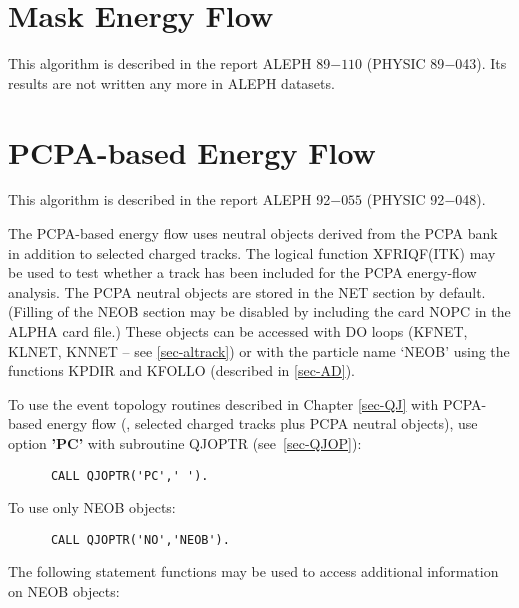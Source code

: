 \par
\section{\label{sec-EFLWM}Mask Energy Flow}
\par
This algorithm is described in the report ALEPH 89$-110$ (PHYSIC 89$-$043).
Its results are not written any more in ALEPH datasets.

\par
\section{\label{sec-EFLWP}PCPA-based Energy Flow}
\par
This algorithm is described in the report ALEPH 92$-055$ (PHYSIC 92$-$048).
\par
The PCPA-based energy flow uses neutral objects derived from the
PCPA bank in addition to selected charged tracks. The logical
function XFRIQF(ITK) may be used to test whether a track has been
included for the PCPA energy-flow analysis.
The PCPA neutral objects are stored in the NET section by default.
(Filling of the NEOB section may be disabled by including the card
NOPC in
the ALPHA card file.)
These objects can be accessed with DO loops
(KFNET, KLNET, KNNET -- see \ref{sec-altrack})
or with the particle name `NEOB' using
the functions KPDIR and KFOLLO (described in
\ref{sec-AD}).
 
\par
 
To use the event topology routines described in
Chapter \ref{sec-QJ} with PCPA-based energy flow  (\ie,
selected charged tracks plus PCPA neutral objects),
use option {\bf 'PC'} with subroutine QJOPTR
(see~\ref{sec-QJOP}):
\begin{verbatim}
      CALL QJOPTR('PC',' ').
\end{verbatim}
To use only NEOB objects:
\begin{verbatim}
      CALL QJOPTR('NO','NEOB').
\end{verbatim}
 
The following statement functions may be used to access
additional information on NEOB objects:
 
